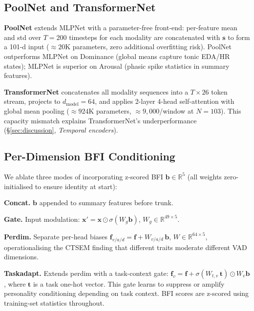\documentclass[sigconf,nonacm]{acmart}
\begin{document}
\subsection{PoolNet and TransformerNet}
\label{sec:poolnet}

\textbf{PoolNet} extends MLPNet with a parameter-free front-end:
per-feature mean and std over $T{=}200$ timesteps for each modality are
concatenated with $\mathbf{s}$ to form a 101-d input
($\approx20$K parameters, zero additional overfitting risk).
PoolNet outperforms MLPNet on Dominance (global means capture tonic EDA/HR
states); MLPNet is superior on Arousal (phasic spike statistics in summary
features).

\textbf{TransformerNet} concatenates all modality sequences into a
$T{\times}26$ token stream, projects to $d_\text{model}{=}64$, and applies
2-layer 4-head self-attention with global mean pooling ($\approx924$K
parameters, $\approx9{,}000$/window at $N{=}103$).
This capacity mismatch explains TransformerNet's underperformance
(§\ref{sec:discussion}, \textit{Temporal encoders}).

\subsection{Per-Dimension BFI Conditioning}
\label{sec:bfi}

We ablate three modes of incorporating z-scored BFI $\mathbf{b} \in
\mathbb{R}^5$ (all weights zero-initialised to ensure identity at start):

\textbf{Concat.} $\mathbf{b}$ appended to summary features before trunk.

\textbf{Gate.} Input modulation:
$\mathbf{x}' = \mathbf{x} \odot \sigma(W_g \mathbf{b})$,
$W_g \in \mathbb{R}^{49 \times 5}$.

\textbf{Perdim.} Separate per-head biases
$\mathbf{f}_{v/a/d} = \mathbf{f} + W_{v/a/d}\,\mathbf{b}$,
$W \in \mathbb{R}^{64 \times 5}$, operationalising the CTSEM finding
that different traits moderate different VAD dimensions.

\textbf{Taskadapt.} Extends perdim with a task-context gate:
$\mathbf{f}_{v} = \mathbf{f} + \sigma(W_{t,v}\,\mathbf{t}) \odot W_v \mathbf{b}$,
where $\mathbf{t}$ is a task one-hot vector.
This gate learns to suppress or amplify personality conditioning
depending on task context.
BFI scores are z-scored using training-set statistics throughout.
\end{document}
